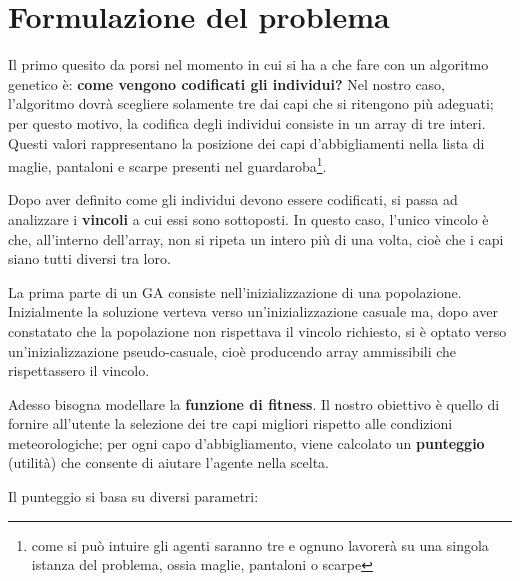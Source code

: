 \documentclass[a4paper, 11pt, oneside]{report}
\begin{document}
            \newpage
            \section{Formulazione del problema}
            Il primo quesito da porsi nel momento in cui si ha a che fare con un algoritmo genetico è: \textbf{come vengono
            codificati gli individui?} Nel nostro caso, l'algoritmo dovrà scegliere solamente tre dai capi che si ritengono
            più adeguati; per questo motivo, la codifica degli individui consiste in un array di tre interi. Questi valori
            rappresentano la posizione dei capi d'abbigliamenti nella lista di maglie, pantaloni e scarpe
            presenti nel guardaroba\footnote{come si può intuire gli agenti saranno tre e ognuno lavorerà su una singola
            istanza del problema, ossia maglie, pantaloni o scarpe}.
            \\
            \par \noindent Dopo aver definito come gli individui devono essere codificati, si passa ad analizzare i \textbf{vincoli} a
            cui essi sono sottoposti. In questo caso, l'unico vincolo è che, all'interno dell'array, non si ripeta un intero
            più di una volta, cioè che i capi siano tutti diversi tra loro.
            \\
            \par \noindent La prima parte di un GA consiste nell'inizializzazione di una popolazione. Inizialmente la soluzione
            verteva verso un'inizializzazione casuale ma, dopo aver constatato che la popolazione non rispettava il vincolo richiesto,
            si è optato verso un'inizializzazione pseudo-casuale, cioè producendo array ammissibili che rispettassero il vincolo.
            \\
            \par \noindent Adesso bisogna modellare la \textbf{funzione di fitness}.
            Il nostro obiettivo è quello di fornire all'utente la selezione dei tre capi migliori rispetto alle condizioni
            meteorologiche; per ogni capo d'abbigliamento, viene calcolato un \textbf{punteggio} (utilità) che consente di aiutare
            l'agente nella scelta.
            \\
            \par \noindent Il punteggio si basa su diversi parametri:
\end{document}
